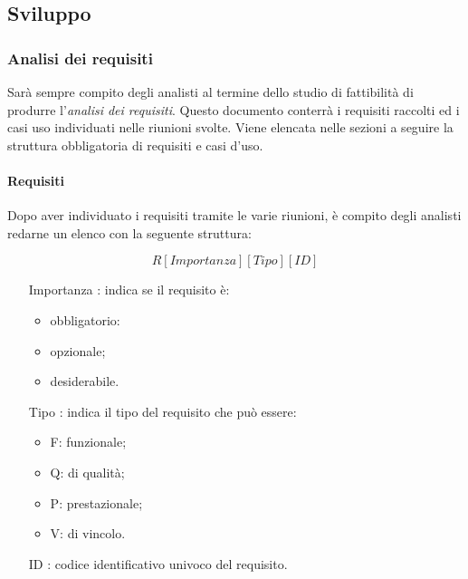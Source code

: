 	\subsection{Sviluppo}
		\subsubsection{Analisi dei requisiti}
			Sarà sempre compito degli analisti al termine dello studio di fattibilità di produrre l'\textit{analisi dei requisiti}. Questo documento conterrà i requisiti raccolti ed i casi uso individuati nelle riunioni svolte.
			Viene elencata nelle sezioni a seguire la struttura obbligatoria di requisiti e casi d'uso.
			\paragraph{Requisiti}%
				Dopo aver individuato i requisiti tramite le varie riunioni, è compito degli analisti redarne un elenco con la seguente struttura:
			
				\begin{equation}
					R[Importanza][Tipo][ID]
				\end{equation}
				
				\begin{itemize}
				
					\item[Importanza]: indica se il requisito è:
					
					\begin{itemize}
						\item obbligatorio:
						\item opzionale;
						\item desiderabile.
					\end{itemize}
					
					\item[Tipo]: indica il tipo del requisito che può essere:
					
					\begin{itemize}
						\item F: funzionale;
						\item Q: di qualità;
						\item P: prestazionale;
						\item V: di vincolo.
					\end{itemize}
					
					\item[ID]: codice identificativo univoco del requisito.
					
				\end{itemize}
			
